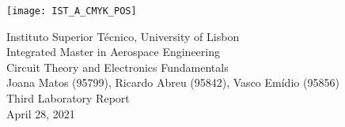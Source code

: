 \thispagestyle {empty}

\texttt{[image: IST\_A\_CMYK\_POS]}

\begin{center}
%
\vspace{1.0cm}

\vspace{1cm}
{\FontLb Instituto Superior Técnico, University of Lisbon} \\ %
\vspace{1cm}
{\FontLb Integrated Master in Aerospace Engineering} \\ %
\vspace{1cm}
{\FontSn Circuit Theory and Electronics Fundamentals} \\ %
\vspace{1cm}
{\FontSn Joana Matos (95799), Ricardo Abreu (95842), Vasco Emídio (95856)} \\ %
\vspace{1cm}
{\FontSn Third Laboratory Report} \\
\vspace{1cm}
{\FontSn April 28, 2021} \\ %
%
\end{center}

